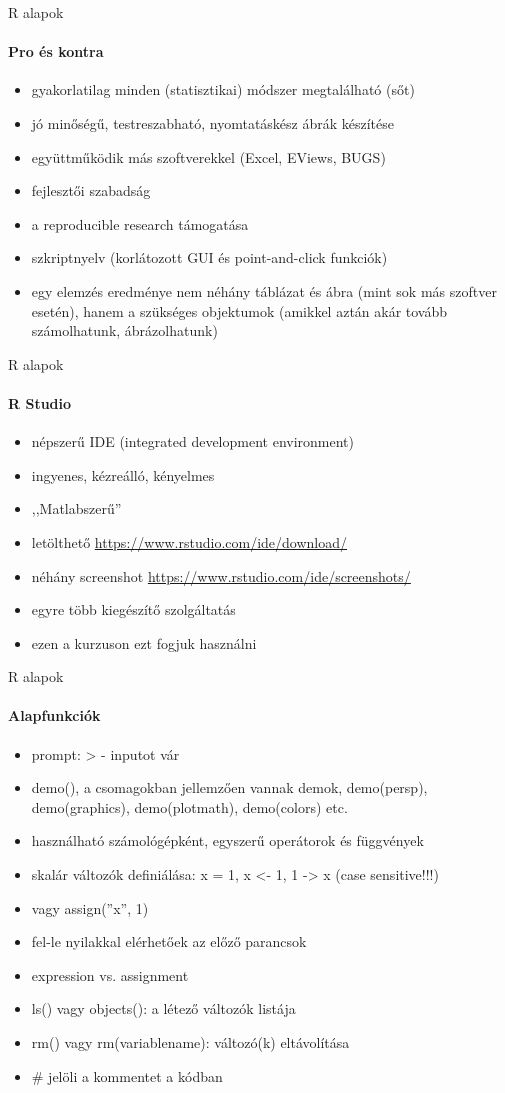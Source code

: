 \documentclass[10pt]{beamer}
\begin{document}
\begin{frame}{R alapok}
\framesubtitle{Pro és kontra}
\begin{itemize}
\item gyakorlatilag minden (statisztikai) módszer megtalálható (sőt)
\item jó minőségű, testreszabható, nyomtatáskész ábrák készítése
\item együttműködik más szoftverekkel (Excel, EViews, BUGS)
\item fejlesztői szabadság
\item a reproducible research támogatása
\item szkriptnyelv (korlátozott GUI és point-and-click funkciók)
\item egy elemzés eredménye nem néhány táblázat és ábra (mint sok más szoftver esetén), hanem a szükséges objektumok (amikkel aztán akár tovább számolhatunk, ábrázolhatunk)
\end{itemize}
\end{frame}

\begin{frame}{R alapok}
\framesubtitle{R Studio}
\begin{itemize}
\item népszerű IDE (integrated development environment)
\item ingyenes, kézreálló, kényelmes
\item ,,Matlabszerű''
\item letölthető \textcolor{blue}{\url{https://www.rstudio.com/ide/download/}}
\item néhány screenshot \textcolor{blue}{\url{https://www.rstudio.com/ide/screenshots/}}
\item egyre több kiegészítő szolgáltatás
\item ezen a kurzuson ezt fogjuk használni
\end{itemize}
\end{frame}

\begin{frame}{R alapok}
\framesubtitle{Alapfunkciók}
\begin{itemize}
\item prompt: > - inputot vár
\item demo(), a csomagokban jellemzően vannak demok, demo(persp), demo(graphics), demo(plotmath), demo(colors) etc.
\item használható számológépként, egyszerű operátorok és függvények
\item skalár változók definiálása: x = 1, x <- 1, 1 -> x (case sensitive!!!)
\item vagy assign(''x'', 1)
\item fel-le nyilakkal elérhetőek az előző parancsok
\item expression vs. assignment
\item ls() vagy objects(): a létező változók listája
\item rm() vagy rm(variablename): változó(k) eltávolítása
\item \# jelöli a kommentet a kódban
\end{itemize}
\end{frame}
\end{document}
